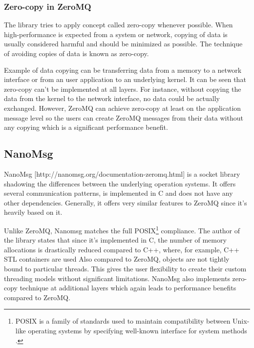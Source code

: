 \subsubsection{Zero-copy in ZeroMQ}
The library tries to apply concept called zero-copy whenever possible. When high-performance is expected from a system or network, copying of data is usually considered harmful and should be minimized as possible. The technique of avoiding copies of data is known as zero-copy.

Example of data copying can be transferring data from a memory to a network interface or from an user application to an underlying kernel. It can be seen that zero-copy can't be implemented at all layers. For instance, without copying the data from the kernel to the network interface, no data could be actually exchanged. However, ZeroMQ can achieve zero-copy at least on the application message level so the users can create ZeroMQ messages from their data without any copying which is a significant performance benefit.
\subsection{NanoMsg}
\label{nanomsg}
NanoMsg [http://nanomsg.org/documentation-zeromq.html] is a socket library shadowing the differences between the underlying operation systems. It offers several communication patterns, is implemented in C and does not have any other dependencies. Generally, it offers very similar features to ZeroMQ since it's heavily based on it.

Unlike ZeroMQ, Nanomsg matches the full POSIX\footnote{POSIX is a family of standards used to maintain compatibility between Unix-like operating systems by specifying well-known interface for system methods \cite{POSIX}. } compliance. The author of the library states that since it's implemented in C, the number of memory allocations is drastically reduced compared to C++, where, for example, C++ STL containers are used  Also compared to ZeroMQ, objects are not tightly bound to particular threads. This gives the user flexibility to create their custom threading models without significant limitations. NanoMsg also implements zero-copy technique at additional layers which again leads to performance benefits compared to ZeroMQ.

